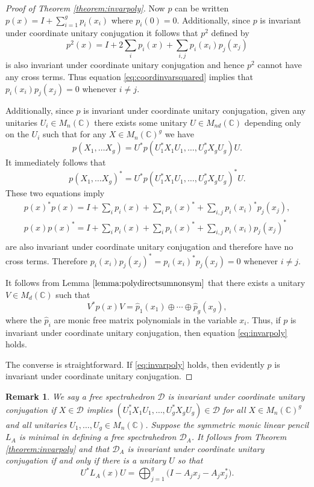 \documentclass[12pt,makeidx]{amsart}
\newtheorem{remark}[theorem]{Remark}
\def\beq{\begin{equation}}
\def\eeq{\end{equation}}
\numberwithin{equation}{section}
\def\cD{ {{\mathcal D}}}
\def\C{ {\mathbb{C}} }
\def\cD{ {\mathcal D} }
\begin{document}
\begin{proof}[Proof of Theorem \ref{theorem:invarpoly}]
 Now $p$ can be written $p(x)=I+\sum_{i=1}^g p_i (x_i)$ where $p_i(0)=0$. Additionally, since $p$ is invariant under coordinate unitary conjugation
 it follows that $p^2$ defined by 
\beq
\label{eq:coordinvarsquared}
p^2 (x)=I+2\sum_i p_i(x)+\sum_{i,j} p_i (x_i) p_j (x_j)
\eeq
 is also invariant under coordinate unitary conjugation and hence $p^2$
 cannot have any cross terms. Thus equation \eqref{eq:coordinvarsquared}  implies that $p_i(x_i) p_j(x_j)=0$ whenever $i \neq j$. 

Additionally, since $p$ is invariant under coordinate unitary conjugation, given any unitaries $U_i \in M_{n}(\C)$ there exists some unitary $U \in M_{nd}(\C)$ depending only on the $U_i$ such that for any $X \in M_n(\C)^g$ we have
\beq\label{eq:4s1}
p(X_1, \dots X_g)=U^*p(U^*_1 X_1 U_1, \dots , U^*_g X_g U_g) U.
\eeq
It immediately follows that
\beq\label{eq:4s2}
p(X_1, \dots X_g)^*=U^* p(U_1^* X_1 U_1, \dots, U_g^* X_g U_g)^* U.
\eeq
These two equations imply
\beq
\label{eq:coordinvarprods}
\begin{array}{ccc}
p(x)^*p(x)=I+\sum_i p_i(x)+\sum_i p_i(x)^*+\sum_{i,j} p_i (x_i)^* p_j (x_j), \\
p(x)p(x)^*=I+\sum_i p_i(x)+\sum_i p_i(x)^*+\sum_{i,j} p_i (x_i) p_j (x_j)^* \\
\end{array}
\eeq
are also invariant under coordinate unitary conjugation and therefore have no cross terms. Therefore $p_i (x_i) p_j (x_j)^*=p_i (x_i)^* p_j (x_j) =0$ whenever $i \neq j$. 

It follows from Lemma $\ref{lemma:polydirectsumnonsym}$  that there exists a unitary $V \in M_d(\C)$ such that
\[
V^* p(x) V=
 \hat{p}_1 (x_1) \oplus \cdots \oplus
 \hat{p}_g(x_g),
\]
where the $\hat{p}_i$ are monic free matrix polynomials in the variable $x_i$. Thus,  if $p$ 
is invariant under coordinate unitary conjugation, then equation \eqref{eq:invarpoly} holds. 


 The converse is straightforward. If \eqref{eq:invarpoly} holds, then evidently $p$ is invariant under coordinate unitary conjugation.
 \end{proof}


\begin{remark}\rm
We say a free spectrahedron $\cD$ is invariant under coordinate unitary conjugation if
 $X\in \cD$ implies $(U_1^* X_1 U_1, \dots , U_g^* X_g U_g) \in \cD$ for all $X \in M_n(\C)^g$ 
and all unitaries $U_1, \dots , U_g \in M_{n}(\C)$.
  Suppose the symmetric monic linear pencil $L_A$ is minimal in defining a free spectrahedron $\cD_{A}$.
 It follows from Theorem \ref{theorem:invarpoly} and  \cite[Theorem 1.2]{HKM13} that $\cD_{A}$ 
is invariant under coordinate unitary conjugation if and only if there is a unitary $U$ so that
\[
U^* L_A(x) U= 
\bigoplus_{j=1}^g \big(I-A_j x_j-A_jx_j^*\big).
\]
\end{remark}
\end{document}
